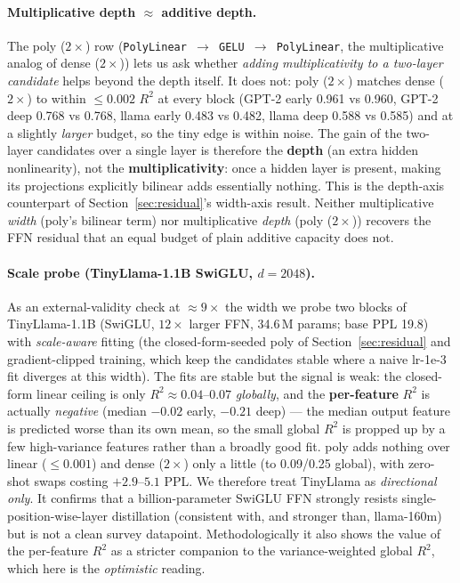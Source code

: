 \documentclass{article}
\begin{document}
\paragraph{Multiplicative depth $\approx$ additive depth.} The poly ($2\times$) row
(\texttt{PolyLinear $\to$ GELU $\to$ PolyLinear}, the multiplicative analog of dense ($2\times$))
lets us ask whether \emph{adding multiplicativity to a two-layer candidate} helps beyond the
depth itself. It does not: poly ($2\times$) matches dense ($2\times$) to within $\le 0.002$ $R^2$
at every block (GPT-2 early 0.961 vs 0.960, GPT-2 deep 0.768 vs 0.768, llama early 0.483 vs 0.482,
llama deep 0.588 vs 0.585) and at a slightly \emph{larger} budget, so the tiny edge is within
noise. The gain of the two-layer candidates over a single layer is therefore the \textbf{depth}
(an extra hidden nonlinearity), not the \textbf{multiplicativity}: once a hidden layer is present,
making its projections explicitly bilinear adds essentially nothing. This is the depth-axis
counterpart of Section~\ref{sec:residual}'s width-axis result. Neither multiplicative
\emph{width} (poly's bilinear term) nor multiplicative \emph{depth} (poly ($2\times$)) recovers
the FFN residual that an equal budget of plain additive capacity does not.

\paragraph{Scale probe (TinyLlama-1.1B SwiGLU, $d = 2048$).} As an external-validity check at
${\approx}9\times$ the width we probe two blocks of TinyLlama-1.1B (SwiGLU, $12\times$ larger
FFN, 34.6\,M params; base PPL 19.8) with \emph{scale-aware} fitting (the closed-form-seeded poly
of Section~\ref{sec:residual} and gradient-clipped training, which keep the candidates stable
where a naive lr-1e-3 fit diverges at this width). The fits are stable but the signal is weak: the
closed-form linear ceiling is only $R^2 \approx 0.04$--$0.07$ \emph{globally}, and the
\textbf{per-feature} $R^2$ is actually \emph{negative} (median $-0.02$ early, $-0.21$ deep) --- the
median output feature is predicted worse than its own mean, so the small global $R^2$ is propped
up by a few high-variance features rather than a broadly good fit. poly adds nothing over linear
($\le 0.001$) and dense ($2\times$) only a little (to 0.09/0.25 global), with zero-shot swaps
costing $+2.9$--$5.1$ PPL. We therefore treat TinyLlama as \emph{directional only}. It confirms
that a billion-parameter SwiGLU FFN strongly resists single-position-wise-layer distillation
(consistent with, and stronger than, llama-160m) but is not a clean survey datapoint.
Methodologically it also shows the value of the per-feature $R^2$ as a stricter companion to the
variance-weighted global $R^2$, which here is the \emph{optimistic} reading.
\end{document}
